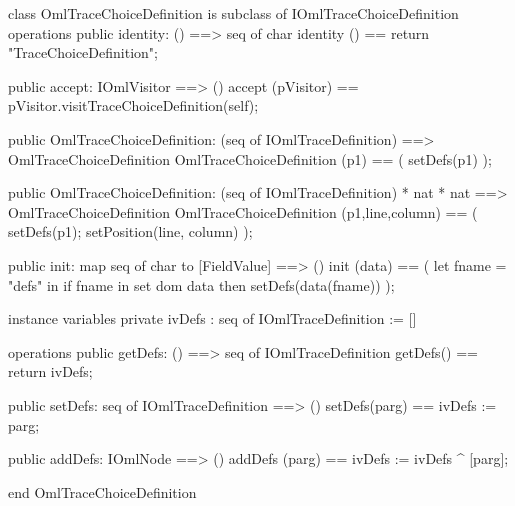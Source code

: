 \begin{vdm_al}
class OmlTraceChoiceDefinition is subclass of IOmlTraceChoiceDefinition
operations
  public identity: () ==> seq of char
  identity () == return "TraceChoiceDefinition";

  public accept: IOmlVisitor ==> ()
  accept (pVisitor) == pVisitor.visitTraceChoiceDefinition(self);

  public OmlTraceChoiceDefinition:
    (seq of IOmlTraceDefinition) ==> OmlTraceChoiceDefinition
  OmlTraceChoiceDefinition (p1) == 
    ( setDefs(p1) );

  public OmlTraceChoiceDefinition:
    (seq of IOmlTraceDefinition) *
    nat *
    nat ==> OmlTraceChoiceDefinition
  OmlTraceChoiceDefinition (p1,line,column) == 
    ( setDefs(p1);
      setPosition(line, column) );

  public init: map seq of char to [FieldValue] ==> ()
  init (data) ==
    ( let fname = "defs" in
        if fname in set dom data
        then setDefs(data(fname)) );

instance variables
  private ivDefs : seq of IOmlTraceDefinition := []

operations
  public getDefs: () ==> seq of IOmlTraceDefinition
  getDefs() == return ivDefs;

  public setDefs: seq of IOmlTraceDefinition ==> ()
  setDefs(parg) == ivDefs := parg;

  public addDefs: IOmlNode ==> ()
  addDefs (parg) == ivDefs := ivDefs ^ [parg];

end OmlTraceChoiceDefinition
\end{vdm_al}

